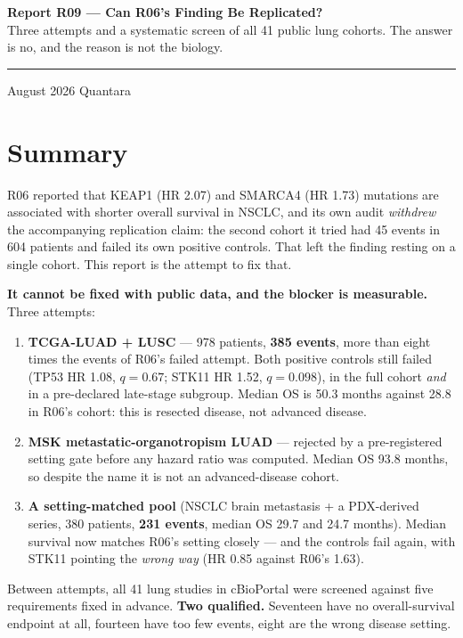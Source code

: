 \documentclass[11pt,a4paper]{article}
\begin{document}
\thispagestyle{empty}
\noindent
{\large\bfseries\color{qnavy} Report R09 --- Can R06's Finding Be Replicated?}\\[2pt]
{\color{qgrey}Three attempts and a systematic screen of all 41 public lung cohorts. The answer
is no, and the reason is not the biology.}\\[6pt]
{\color{qgrey}\rule{\textwidth}{0.4pt}}

\medskip
{} August 2026 \quad\textbullet\quad Quantara

\section*{Summary}

R06 reported that KEAP1 (HR 2.07) and SMARCA4 (HR 1.73) mutations are associated with shorter
overall survival in NSCLC, and its own audit \emph{withdrew} the accompanying replication claim:
the second cohort it tried had 45 events in 604 patients and failed its own positive controls.
That left the finding resting on a single cohort. This report is the attempt to fix that.

\textbf{It cannot be fixed with public data, and the blocker is measurable.} Three attempts:

\begin{enumerate}[leftmargin=1.4em,itemsep=2pt]
\item \textbf{TCGA-LUAD + LUSC} --- 978 patients, \textbf{385 events}, more than eight times the
      events of R06's failed attempt. Both positive controls still failed (TP53 HR 1.08,
      $q=0.67$; STK11 HR 1.52, $q=0.098$), in the full cohort \emph{and} in a pre-declared
      late-stage subgroup. Median OS is 50.3 months against 28.8 in R06's cohort: this is
      resected disease, not advanced disease.
\item \textbf{MSK metastatic-organotropism LUAD} --- rejected by a pre-registered setting gate
      before any hazard ratio was computed. Median OS 93.8 months, so despite the name it is not
      an advanced-disease cohort.
\item \textbf{A setting-matched pool} (NSCLC brain metastasis + a PDX-derived series, 380
      patients, \textbf{231 events}, median OS 29.7 and 24.7 months). Median survival now matches
      R06's setting closely --- and the controls fail again, with STK11 pointing the
      \emph{wrong way} (HR 0.85 against R06's 1.63).
\end{enumerate}

Between attempts, all 41 lung studies in cBioPortal were screened against five requirements
fixed in advance. \textbf{Two qualified.} Seventeen have no overall-survival endpoint at all,
fourteen have too few events, eight are the wrong disease setting.
\end{document}
